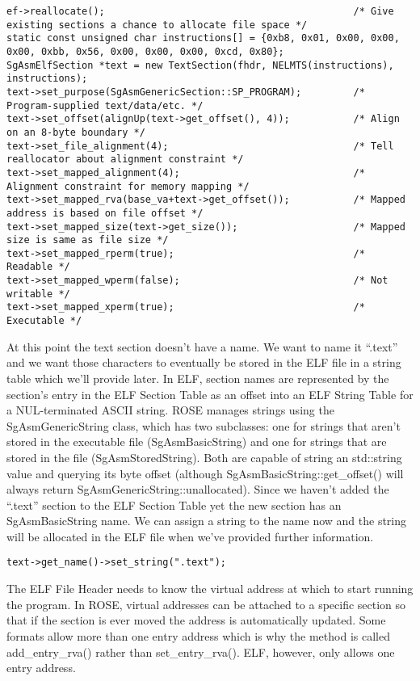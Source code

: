 \begin{verbatim}
ef->reallocate();                                           /* Give existing sections a chance to allocate file space */
static const unsigned char instructions[] = {0xb8, 0x01, 0x00, 0x00, 0x00, 0xbb, 0x56, 0x00, 0x00, 0x00, 0xcd, 0x80};
SgAsmElfSection *text = new TextSection(fhdr, NELMTS(instructions), instructions);
text->set_purpose(SgAsmGenericSection::SP_PROGRAM);         /* Program-supplied text/data/etc. */
text->set_offset(alignUp(text->get_offset(), 4));           /* Align on an 8-byte boundary */
text->set_file_alignment(4);                                /* Tell reallocator about alignment constraint */
text->set_mapped_alignment(4);                              /* Alignment constraint for memory mapping */
text->set_mapped_rva(base_va+text->get_offset());           /* Mapped address is based on file offset */
text->set_mapped_size(text->get_size());                    /* Mapped size is same as file size */
text->set_mapped_rperm(true);                               /* Readable */
text->set_mapped_wperm(false);                              /* Not writable */
text->set_mapped_xperm(true);                               /* Executable */
\end{verbatim}

At this point the text section doesn't have a name. We want to name it
``.text'' and we want those characters to eventually be stored in the
ELF file in a string table which we'll provide later. In ELF, section
names are represented by the section's entry in the ELF Section Table
as an offset into an ELF String Table for a NUL-terminated ASCII
string. ROSE manages strings using the SgAsmGenericString class, which
has two subclasses: one for strings that aren't stored in the
executable file (SgAsmBasicString) and one for strings that are stored
in the file (SgAsmStoredString). Both are capable of string an
std::string value and querying its byte offset (although
SgAsmBasicString::get\_offset() will always return
SgAsmGenericString::unallocated).  Since we haven't added the
``.text'' section to the ELF Section Table yet the new section has an
SgAsmBasicString name. We can assign a string to the name now and the
string will be allocated in the ELF file when we've provided further
information.

\begin{verbatim}
text->get_name()->set_string(".text");
\end{verbatim}

The ELF File Header needs to know the virtual address at which to
start running the program. In ROSE, virtual addresses can be attached
to a specific section so that if the section is ever moved the address
is automatically updated. Some formats allow more than one entry
address which is why the method is called add\_entry\_rva() rather than
set\_entry\_rva(). ELF, however, only allows one entry address.

